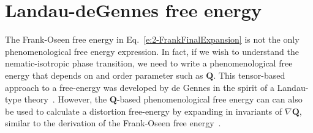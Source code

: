 \section{Landau-deGennes free energy}
The Frank-Oseen free energy in Eq.~\ref{e:2-FrankFinalExpansion} is not the only phenomenological free energy expression.
In fact, if we wish to understand the nematic-isotropic phase transition, we need to write a phenomenological free energy that depends on and order parameter such as $\mathbf{Q}$.
This tensor-based approach to a free-energy was developed by de Gennes in the spirit of a Landau-type theory~\cite{RN33}.
However, the $\mathbf{Q}$-based phenomenological free energy can can also be used to calculate a distortion free-energy by expanding in invariants of $\nabla \mathbf{Q}$, similar to the derivation of the Frank-Oseen free energy~\cite{RN33,RN189,RN198}.


